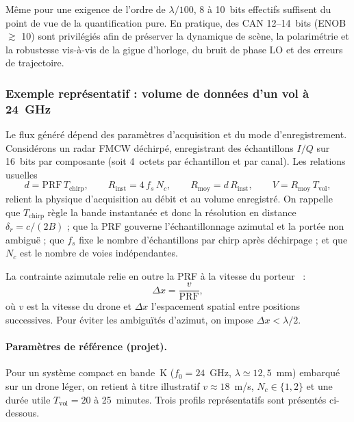 \noindent Même pour une exigence de l’ordre de $\lambda/100$, 8 à 10~bits effectifs suffisent du point de vue de la quantification pure. En pratique, des CAN 12–14~bits (ENOB $\gtrsim$ 10) sont privilégiés afin de préserver la dynamique de scène, la polarimétrie et la robustesse vis-à-vis de la gigue d’horloge, du bruit de phase LO et des erreurs de trajectoire.

\subsubsection{Exemple représentatif : volume de données d’un vol à 24~GHz}

Le flux généré dépend des paramètres d’acquisition et du mode d’enregistrement. Considérons un radar FMCW déchirpé, enregistrant des échantillons $I/Q$ sur 16~bits par composante (soit 4~octets par échantillon et par canal). Les relations usuelles~\cite{cumming2005,richards2010,Aguasca2013_ARBRES_UAV_SAR}
\[
d = \mathrm{PRF}\,T_{\mathrm{chirp}}, \qquad
R_{\mathrm{inst}} = 4\,f_s\,N_c, \qquad
R_{\mathrm{moy}} = d\,R_{\mathrm{inst}}, \qquad
V = R_{\mathrm{moy}}\,T_{\mathrm{vol}},
\]
relient la physique d’acquisition au débit et au volume enregistré. On rappelle que $T_{\mathrm{chirp}}$ règle la bande instantanée et donc la résolution en distance $\delta_r = c/(2B)$ ; que la PRF gouverne l’échantillonnage azimutal et la portée non ambiguë ; que $f_s$ fixe le nombre d’échantillons par chirp après déchirpage ; et que $N_c$ est le nombre de voies indépendantes.

La contrainte azimutale relie en outre la PRF à la vitesse du porteur~\cite{cumming2005,richards2010} :
\begin{equation}
    \Delta x = \frac{v}{\mathrm{PRF}},
\end{equation}
où $v$ est la vitesse du drone et $\Delta x$ l’espacement spatial entre positions successives. Pour éviter les ambiguïtés d’azimut, on impose $\Delta x < \lambda/2$.

\paragraph{Paramètres de référence (projet).}
Pour un système compact en bande~K ($f_0=24$~GHz, $\lambda\simeq12{,}5$~mm) embarqué sur un drone léger, on retient à titre illustratif $v \approx 18$~m/s, $N_c\in\{1,2\}$ et une durée utile $T_{\mathrm{vol}}=20$ à 25~minutes. Trois profils représentatifs sont présentés ci-dessous.

